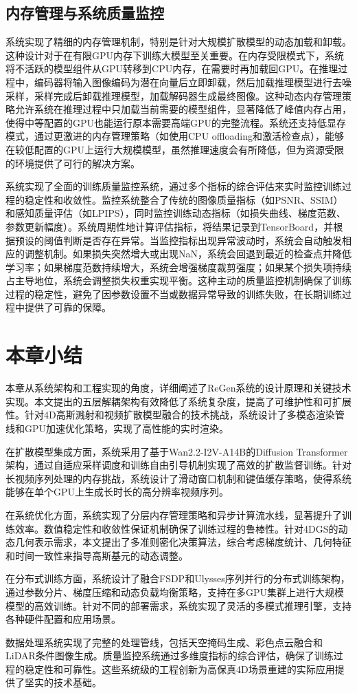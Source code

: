 \subsection{内存管理与系统质量监控}

系统实现了精细的内存管理机制，特别是针对大规模扩散模型的动态加载和卸载。这种设计对于在有限GPU内存下训练大模型至关重要。在内存受限模式下，系统将不活跃的模型组件从GPU转移到CPU内存，在需要时再加载回GPU。在推理过程中，编码器将输入图像编码为潜在向量后立即卸载，然后加载推理模型进行去噪采样，采样完成后卸载推理模型，加载解码器生成最终图像。这种动态内存管理策略允许系统在推理过程中只加载当前需要的模型组件，显著降低了峰值内存占用，使得中等配置的GPU也能运行原本需要高端GPU的完整流程。系统还支持低显存模式，通过更激进的内存管理策略（如使用CPU offloading和激活检查点），能够在较低配置的GPU上运行大规模模型，虽然推理速度会有所降低，但为资源受限的环境提供了可行的解决方案。

系统实现了全面的训练质量监控系统，通过多个指标的综合评估来实时监控训练过程的稳定性和收敛性。监控系统整合了传统的图像质量指标（如PSNR、SSIM）和感知质量评估（如LPIPS），同时监控训练动态指标（如损失曲线、梯度范数、参数更新幅度）。系统周期性地计算评估指标，将结果记录到TensorBoard，并根据预设的阈值判断是否存在异常。当监控指标出现异常波动时，系统会自动触发相应的调整机制。如果损失突然增大或出现NaN，系统会回退到最近的检查点并降低学习率；如果梯度范数持续增大，系统会增强梯度裁剪强度；如果某个损失项持续占主导地位，系统会调整损失权重实现平衡。这种主动的质量监控机制确保了训练过程的稳定性，避免了因参数设置不当或数据异常导致的训练失败，在长期训练过程中提供了可靠的保障。

\section{本章小结}

本章从系统架构和工程实现的角度，详细阐述了ReGen系统的设计原理和关键技术实现。本文提出的五层解耦架构有效降低了系统复杂度，提高了可维护性和可扩展性。针对4D高斯溅射和视频扩散模型融合的技术挑战，系统设计了多模态渲染管线和GPU加速优化策略，实现了高性能的实时渲染。

在扩散模型集成方面，系统采用了基于Wan2.2-I2V-A14B的Diffusion Transformer架构，通过自适应采样调度和训练自由引导机制实现了高效的扩散监督训练。针对长视频序列处理的内存挑战，系统设计了滑动窗口机制和键值缓存策略，使得系统能够在单个GPU上生成长时长的高分辨率视频序列。

在系统优化方面，系统实现了分层内存管理策略和异步计算流水线，显著提升了训练效率。数值稳定性和收敛性保证机制确保了训练过程的鲁棒性。针对4DGS的动态几何表示需求，本文提出了多准则密化决策算法，综合考虑梯度统计、几何特征和时间一致性来指导高斯基元的动态调整。

在分布式训练方面，系统设计了融合FSDP和Ulysses序列并行的分布式训练架构，通过参数分片、梯度压缩和动态负载均衡策略，支持在多GPU集群上进行大规模模型的高效训练。针对不同的部署需求，系统实现了灵活的多模式推理引擎，支持各种硬件配置和应用场景。

数据处理系统实现了完整的处理管线，包括天空掩码生成、彩色点云融合和LiDAR条件图像生成。质量监控系统通过多维度指标的综合评估，确保了训练过程的稳定性和可靠性。这些系统级的工程创新为高保真4D场景重建的实际应用提供了坚实的技术基础。
